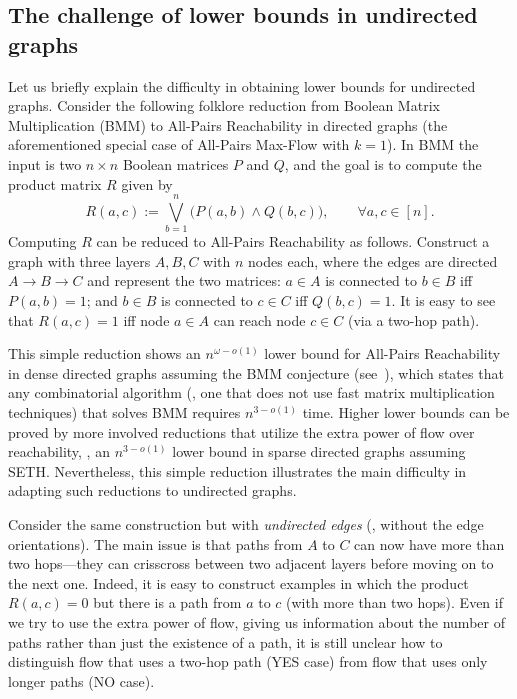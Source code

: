 \documentclass{toc}
\theoremstyle{plain}
\newcommand{\ProblemName}[1]{\textsf{#1}}
\newcommand{\SETH}{SETH\xspace}
\newcommand{\APMF}{\ProblemName{All-Pairs Max-Flow}\xspace}
\newcommand{\APR}{\ProblemName{All-Pairs Reachability}\xspace}
\begin{document}
\subsection{The challenge of lower bounds in undirected graphs}
Let us briefly explain the difficulty in obtaining lower bounds for undirected graphs.
Consider the following folklore reduction from Boolean Matrix Multiplication (BMM) to \APR in directed graphs
(the aforementioned special case of \APMF with $k=1$).
In BMM the input is two $n\times n$ Boolean matrices $P$ and $Q$,
and the goal is to compute the product matrix $R$ given by
%
\[
  R(a,c) := \bigvee_{b=1}^n \big( P(a,b) \wedge Q(b,c) \big),
  \qquad
  \forall a,c \in [n].
\]
Computing $R$ can be reduced to \APR as follows.
Construct a graph with three layers $A,B,C$ with $n$ nodes each,
where the edges are directed $A \to B \to C$ and represent the two matrices:
$a \in A$ is connected to $b \in B$ iff $P(a,b) =1$;
and $b \in B$ is connected to $c \in C$ iff $Q(b,c)=1$.
It is easy to see that $R(a,c)=1$ iff node $a \in A$ can reach node $c \in C$ (via a two-hop path).

This simple reduction shows an $n^{\omega-o(1)}$ lower bound for \APR
in dense directed graphs assuming the BMM conjecture (see~\cite{AW14}), which states that any combinatorial algorithm (\ie, one that does not use fast matrix multiplication techniques) that solves BMM requires $n^{3-o(1)}$ time.
Higher lower bounds can be proved by more involved reductions
that utilize the extra power of flow over reachability,
\eg, an $n^{3-o(1)}$ lower bound in sparse directed graphs assuming \SETH \cite{KT18}.
Nevertheless, this simple reduction illustrates the main difficulty
in adapting such reductions to undirected graphs.

Consider the same construction but with \emph{undirected edges}
(\ie, without the edge orientations).
The main issue is that paths from $A$ to $C$ can now have more than two hops---they can crisscross between two adjacent layers before moving on to the next one.
Indeed, it is easy to construct examples in which the product $R(a,c)=0$ but there is a path from $a$ to $c$ (with more than two hops).
Even if we try to use the extra power of flow, giving us information about the number of paths rather than just the existence of a path, it is still unclear how to distinguish flow that uses a two-hop path (YES case) from flow that uses only longer paths (NO case).
\end{document}
